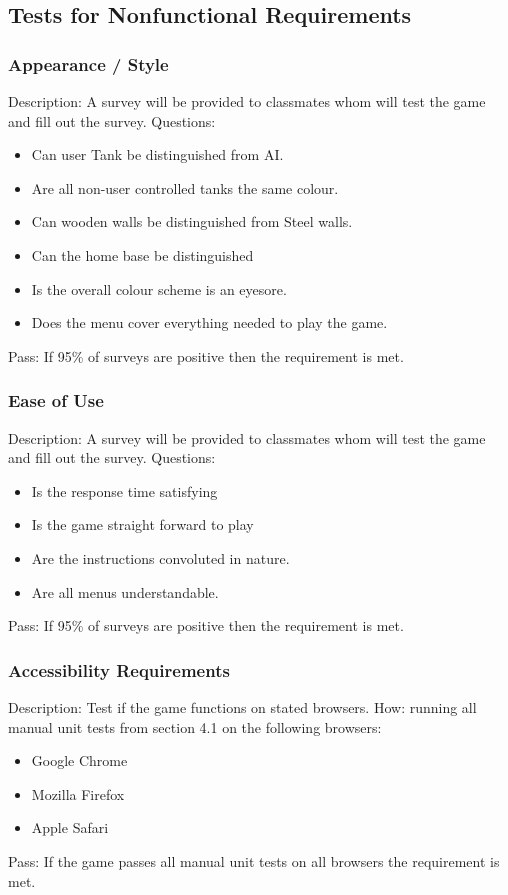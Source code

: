 \documentclass{article}
\begin{document}
\subsection{Tests for Nonfunctional Requirements}

\subsubsection{Appearance / Style}
Description: A survey will be provided to classmates whom will test the game 
and fill out the survey.  \newline
Questions: 
\begin{itemize}
\item Can user Tank be distinguished from AI.
\item Are all non-user controlled tanks the same colour.
\item Can wooden walls be distinguished from Steel walls.
\item Can the home base be distinguished
\item Is the overall colour scheme is an eyesore.
\item Does the menu cover everything needed to play the game.
\end{itemize}
Pass: If 95\% of surveys are positive then the requirement is met.


\subsubsection{Ease of Use}
Description: A survey will be provided to classmates whom will test the game 
and fill out the survey.  \newline
Questions: 
\begin{itemize}
\item Is the response time satisfying
\item Is the game straight forward to play
\item Are the instructions convoluted in nature.
\item Are all menus understandable.
\end{itemize}
Pass: If 95\% of surveys are positive then the requirement is met.


\subsubsection{Accessibility Requirements}
Description: Test if the game functions on stated browsers.
How: running all manual unit tests from section 4.1 on the following browsers:
\begin{itemize}
\item Google Chrome
\item Mozilla Firefox
\item Apple Safari
\end{itemize}
Pass:  If the game passes all manual unit tests on all browsers the requirement
 is met.\newline
\end{document}
